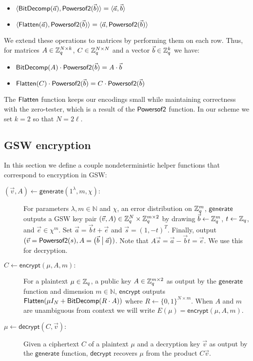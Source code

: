 \begin{itemize}
\item $\langle \mathsf{BitDecomp}(\vec{a}), \mathsf{Powersof2}(\vec{b}) \rangle = \langle \vec{a}, \vec{b} \rangle$
\item $\langle \mathsf{Flatten}(\vec{a}), \mathsf{Powersof2}(\vec{b}) \rangle = \langle \vec{a}, \mathsf{Powersof2}(\vec{b}) \rangle$
\end{itemize}

We extend these operations to matrices by performing them on each row.  Thus, for matrices $A \in \mathbb{Z}_q^{N \times k}$, $C \in \mathbb{Z}_q^{N \times N}$ and a vector $\vec{b} \in \mathbb{Z}_q^k$ we have:

\begin{itemize}
\item $\mathsf{BitDecomp}(A)\cdot\mathsf{Powersof2}(\vec{b}) = A\cdot\vec{b}$
\item $\mathsf{Flatten}(C)\cdot\mathsf{Powersof2}(\vec{b}) = C\cdot\mathsf{Powersof2}(\vec{b})$
\end{itemize}

The $\mathsf{Flatten}$ function keeps our encodings small while maintaining correctness with the zero-tester, which is a result of the $\mathsf{Powersof2}$ function.  In our scheme we set $k = 2$ so that $N = 2\ell$.

\subsection{GSW encryption}

In this section we define a couple nondeterministic helper functions that correspond to encryption in GSW: 

\begin{description}

\item[$(\vec{v}, A) \leftarrow \mathsf{generate}(1^\lambda, m, \chi):$] For parameters $\lambda, m \in \mathbb{N}$ and $\chi$, an error distribution on $\mathbb{Z}_q^m$, $\mathsf{generate}$ outputs a GSW key pair $(\vec{v},A) \in \mathbb{Z}_q^N \times \mathbb{Z}_q^{m \times 2}$ by drawing $\vec{b} \leftarrow \mathbb{Z}_q^m$, $t \leftarrow \mathbb{Z}_q$, and $\vec{e}\in \chi^m$.  Set $\vec{a} = \vec{b}t + \vec{e}$ and $\vec{s} = (1, -t)^T$.  Finally, output $(\vec{v} = \mathsf{Powersof2}(s), A = \big(\vec{b} \; \big| \; \vec{a}\big))$.  Note that $A\vec{s} = \vec{a} - \vec{b}t = \vec{e}$.  We use this for decryption.

\item[$C \leftarrow \mathsf{encrypt}(\mu, A,m):$]  For a plaintext $\mu \in \mathbb{Z}_q$, a public key $A \in \mathbb{Z}_q^{m \times 2}$ as output by the $\mathsf{generate}$ function and dimension $m \in \mathbb{N}$, $\mathsf{encrypt}$ outputs $\mathsf{Flatten}(\mu I_N + \mathsf{BitDecomp}(R\cdot A))$ where $R \leftarrow \{0,1\}^{N\times m}$.  When $A$ and $m$ are unambiguous from context we will write $E(\mu) = \mathsf{encrypt}(\mu, A, m)$.

\item[$\mu \leftarrow \mathsf{decrypt}(C, \vec{v}):$]  Given a ciphertext $C$ of a plaintext $\mu$ and a decryption key $\vec{v}$ as output by the $\mathsf{generate}$ function, $\mathsf{decrypt}$ recovers $\mu$ from the product $C\vec{v}$.  
\end{description}

